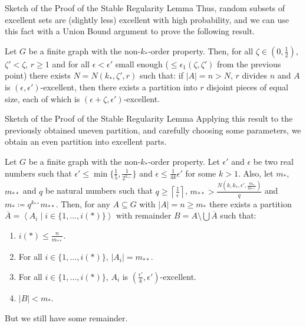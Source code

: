 \documentclass{beamer}
\newcommand{\parcurly}[1]{\{ #1 \}}
\newcommand{\parround}[1]{( #1 )}
\newcommand{\Partriangle}[1]{\left< #1 \right>}
\newcommand{\ceil}[1]{\left\lceil #1 \right\rceil}
\begin{document}
\begin{frame}{Sketch of the Proof of the Stable Regularity Lemma}
    Thus, random subsets of excellent sets are (slightly less) excellent with high probability,
    and we can use this fact with a Union Bound argument to prove the following result.

    \begin{lemma}
        Let $G$ be a finite graph with the non-$k_{*}$-order property.
        Then, for all $\zeta \in \parround{0, \frac{1}{2}}$, $\zeta' < \zeta$, $r \geq 1$ and for all
        $\epsilon < \epsilon'$ small enough ($\leq \epsilon_1(\zeta, \zeta')$ from the previous point) there exists
        $N = N\parround{k_{*}, \zeta', r}$ such that: if $|A| = n > N$, $r$ divides $n$ and $A$ is
        $\parround{\epsilon, \epsilon'}$-excellent, then there exists a partition into $r$ disjoint pieces of equal
        size, each of which is $\parround{\epsilon + \zeta, \epsilon'}$-excellent.
    \end{lemma}
\end{frame}

\begin{frame}{Sketch of the Proof of the Stable Regularity Lemma}
    Applying this result to the previously obtained uneven partition, and carefully choosing some parameters,
    we obtain an even partition into excellent parts.
    \begin{lemma}
        Let $G$ be a finite graph with the non-$k_{*}$-order property.
        Let $\epsilon'$ and $\epsilon$ be two real numbers such that
        $\epsilon' \leq \min \parcurly{\frac{1}{5}, \frac{1}{2^{k_{**}}}}$ and $\epsilon \leq \frac{1}{4k} \epsilon'$ for some $k > 1$.
        Also, let $m_*$, $m_{**}$ and $q$ be natural numbers such that $q \geq \ceil{\frac{1}{\epsilon}}$,
        $m_{**} > \frac{N \parround{k, k_*, \epsilon', \frac{m_*}{m_{**}}}}{q}$ and $m_* \coloneqq q^{k_{**}} m_{**}$.
        Then, for any $A \subseteq G$ with $|A| = n \geq m_*$ there exists a partition
        $\overline{A} = \Partriangle{A_i \mid i \in \parcurly{1, \dots, i(*)}}$ with remainder $B = A \setminus \bigcup \overline{A}$ such that:
        \begin{enumerate}
            \item $i(*) \leq \frac{n}{m_{**}}$.
            \item For all $i \in \parcurly{1, \dots, i(*)}$, $|A_i| = m_{**}$.
            \item For all $i \in \parcurly{1, \dots, i(*)}$, $A_i$ is $\parround{\frac{\epsilon'}{k}, \epsilon'}$-excellent.
            \item$|B| < m_*$.
        \end{enumerate}
    \end{lemma}
    But we still have some remainder.
\end{frame}
\end{document}
